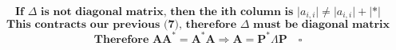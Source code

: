 \documentclass[10pt]{article}
\begin{document}
\[\textbf{If }\Delta\textbf{ is not diagonal matrix, then the ith column is }\lvert a_{i,i} \rvert \neq \lvert a_{i,i} \rvert + \lvert \ast \rvert\]
\[\textbf{This contracts our previous (7), therefore }\Delta\textbf{ must be diagonal matrix}\]
\[\textbf{Therefore }\textbf{A}\textbf{A}^\ast = \textbf{A}^\ast\textbf{A}\Rightarrow\textbf{A}=\textbf{P}^\ast\Lambda\textbf{P}\quad\square\]
\end{document}
